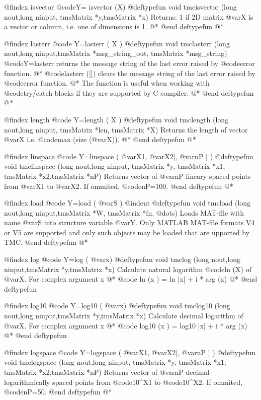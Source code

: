 @findex  isvector
@code{Y= isvector (X) }
@deftypefun void tmcisvector  (long nout,long ninput, tmsMatrix *y,tmsMatrix *x)
Returns: 1 if 2D matrix @var{X} is  a vector or column, i.e. one of dimensions is 1. @*
@end deftypefun
@*


@findex  lasterr
@code{ Y=lasterr  ( X ) }
@deftypefun void tmclasterr  (long nout,long ninput,tmsMatrix *msg_string_out, tmsMatrix *msg_string)
@code{Y=lasterr} returns the message string of the last error raised by @code{error} function. @*
@code{lasterr ([])} clears the message string of the last error raised by @code{error} function. @*
The function is useful when working with @code{try/catch} blocks if they are supported by C-compiler. @*
@end deftypefun
@*


@findex  length
@code{ Y=length  ( X ) }
@deftypefun void tmclength  (long nout,long ninput, tmsMatrix *len, tmsMatrix *X)
Returns the length of vector @var{X} i.e. @code{max (size (@var{X}))}. @*
@end deftypefun
@*

@findex  linspace
@code{ Y=linspace  ( @var{X1}, @var{X2}[, @var{nP} ] ) }
@deftypefun void tmclinspace (long nout,long ninput, tmsMatrix *y, tmsMatrix *x1, tmsMatrix *x2,tmsMatrix *nP)
Returns vector  of @var{nP} lineary spaced points from @var{X1} to  @var{X2}. If ommited, @code{nP=100}.
@end deftypefun
@*

@findex  load
@code{ Y=load  ( @var{S} ) }
@indent @deftypefun void tmcload (long nout,long ninput,tmsMatrix *W, tmsMatrix *fn, @dots{})
Loads MAT-file with name @var{S}   into structure variable @var{Y}. Only MATLAB MAT-file  formats V4 or V5 are supported and only such objects may be loaded that are upported by TMC.
@end deftypefun
@*


@findex   log
@code{  Y=log  ( @var{x})}
@deftypefun void tmclog  (long nout,long ninput,tmsMatrix *y,tmsMatrix *x)
Calculate  natural logarithm @code{ln (X)} of @var{X}. For complex argument x @*
  @code{ ln  (x ) = ln |x| + i * arg (x) } @*
@end deftypefun


@findex   log10
@code{  Y=log10  ( @var{x})}
@deftypefun void tmclog10  (long nout,long ninput,tmsMatrix *y,tmsMatrix *x)
Calculate  decimal logarithm   of @var{X}. For complex argument x @*
  @code{ log10  (x ) = log10 |x| + i * arg (x) } @*
@end deftypefun


@findex  logspace
@code{ Y=logspace  ( @var{X1}, @var{X2}[, @var{nP} ] ) }
@deftypefun void tmclogspace  (long nout,long ninput, tmsMatrix *y, tmsMatrix *x1, tmsMatrix *x2,tmsMatrix *nP)
Returns vector  of @var{nP} decimal-logarithmically  spaced points from @code{10^X1} to  @code{10^X2}. If ommited, @code{nP=50}.
@end deftypefun
@*

